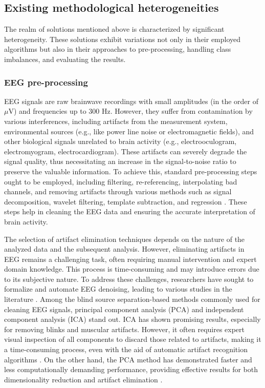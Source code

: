 \documentclass[a4paper,fleqn]{cas-sc}
\begin{document}

\subsection{Existing methodological heterogeneities}

The realm of solutions mentioned above is characterized by significant heterogeneity. These solutions exhibit variations not only in their employed algorithms but also in their approaches to pre-processing, handling class imbalances, and evaluating the results.
\subsubsection{EEG pre-processing}

EEG signals are raw brainwave recordings with small amplitudes (in the order of $\mu$V) and frequencies up to 300 Hz. However, they suffer from contamination by various interferences, including artifacts from the measurement system, environmental sources (e.g., like power line noise or electromagnetic fields), and other biological signals unrelated to brain activity (e.g., electrooculogram, electromyogram, electrocardiogram). These artifacts can severely degrade the signal quality, thus necessitating an increase in the signal-to-noise ratio to preserve the valuable information. To achieve this, standard pre-processing steps ought to be employed, including filtering, re-referencing, interpolating bad channels, and removing artifacts through various methods such as signal decomposition, wavelet filtering, template subtraction, and regression \cite{kim2018preprocessing}. These steps help in cleaning the EEG data and ensuring the accurate interpretation of brain activity.

The selection of artifact elimination techniques depends on the nature of the analyzed data and the subsequent analysis. However, eliminating artifacts in EEG remains a challenging task, often requiring manual intervention and expert domain knowledge. This process is time-consuming and may introduce errors due to its subjective nature. To address these challenges, researchers have sought to formalize and automate EEG denoising, leading to various studies in the literature \cite{GeethaEEGDenoise,UpadhyayEEGDenoise,SatyenderEEGDenoise,MumtazEEGArtifactReview}.
Among the blind source separation-based methods commonly used for cleaning EEG signals, principal component analysis (PCA) \cite{ShlensPCA} and independent component analysis (ICA) \cite{HyvarinenICA} stand out. ICA has shown promising results, especially for removing blinks and muscular artifacts. However, it often requires expert visual inspection of all components to discard those related to artifacts, making it a time-consuming process, even with the aid of automatic artifact recognition algorithms \cite{LiIcalabel}. On the other hand, the PCA method has demonstrated faster and less computationally demanding performance, providing effective results for both dimensionality reduction and artifact elimination \cite{MumtazEEGArtifactReview}.
\end{document}
